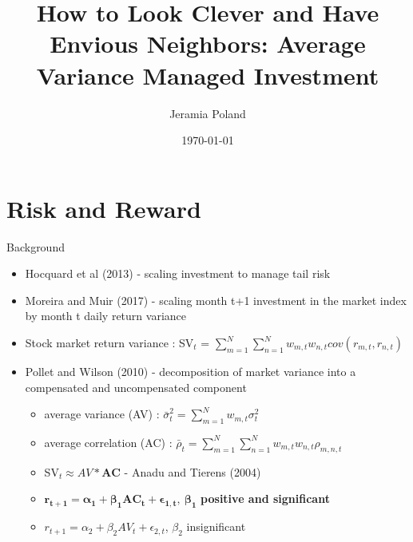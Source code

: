 \documentclass{beamer}
\begin{document}
\title[Average Variance]{How to Look Clever and Have Envious Neighbors: Average
	Variance Managed Investment}   
\author[J. Poland]{Jeramia Poland} 
\date{\today}

\begin{frame}
\titlepage
\end{frame}

\section{Risk and Reward}
\begin{frame}{Background}
	\begin{itemize}[<+->]
		\item Hocquard et al (2013) - scaling investment to manage tail risk
		\item Moreira and Muir (2017) - scaling month t+1 investment in the market index by month t daily return variance
		\item Stock market return variance : SV$_{t}$ = $\sum_{m=1}^{N}\sum_{n=1}^{N}w_{m,t}w_{n,t}cov(r_{m,t},r_{n,t})$
		\item Pollet and Wilson (2010) - decomposition of market variance into a compensated and uncompensated component
		\begin{itemize}[<+->]
			\item average variance (AV) : $\bar{\sigma}^{2}_{t} = \sum_{m=1}^{N}w_{m,t}\sigma^{2}_{t}$
			\item average correlation (AC) : $\bar{\rho}_{t} = \sum_{m=1}^{N}\sum_{n=1}^{N}w_{m,t}w_{n,t}\rho_{m,n,t}$
			\item SV$_{t} \approx AV*\bm{AC}$  - Anadu and Tierens (2004)
			\item $\bm{r_{t+1} = \alpha_{1} + \beta_{1}AC_{t} + \epsilon_{1,t},~\beta_{1}}$ \textbf{positive and significant}
			\item $r_{t+1} = \alpha_{2} + \beta_{2}AV_{t} + \epsilon_{2,t}$, $\beta_{2}$ insignificant 

\end{itemize}
\end{itemize}
\end{frame}
\end{document}
